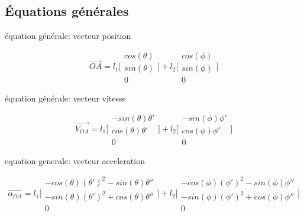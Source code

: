 \documentclass{article}
\begin{document}
\subsection{Équations générales}
équation générale: vecteur position

\begin{equation}
\overrightarrow{OA} = 
    l_1\Bigg[\begin{array}{cc}
    cos(\theta) \\
    sin(\theta) \\
    0
    \end{array}\Bigg]
    +
    l_2\Bigg[\begin{array}{cc}
    cos(\phi) \\
    sin(\phi) \\
    0
    \end{array}\Bigg]
\end{equation}

\noindent équation générale: vecteur vitesse

\begin{equation}
\overrightarrow{V_{OA}} = 
    l_1\Bigg[\begin{array}{cc}
    -sin(\theta)\theta' \\
    cos(\theta)\theta' \\
    0
    \end{array}\Bigg]
    +
    l_2\Bigg[\begin{array}{cc}
    -sin(\phi)\phi' \\
    cos(\phi)\phi' \\
    0
    \end{array}\Bigg]
\end{equation}

\noindent equation generale: vecteur acceleration

\begin{equation}
\overrightarrow{\alpha_{OA}} =
	l_1\Bigg[\begin{array}{cc}
	-cos(\theta)(\theta')^2-sin(\theta)\theta'' \\
	-sin(\theta)(\theta')^2+cos(\theta)\theta'' \\
	0
	\end{array}\Bigg]
	+
	l_2\Bigg[\begin{array}{cc}
	-cos(\phi)(\phi')^2-sin(\phi)\phi'' \\
	-sin(\phi)(\phi')^2+cos(\phi)\phi'' \\
	0
	\end{array}\Bigg]
\end{equation}
\end{document}
